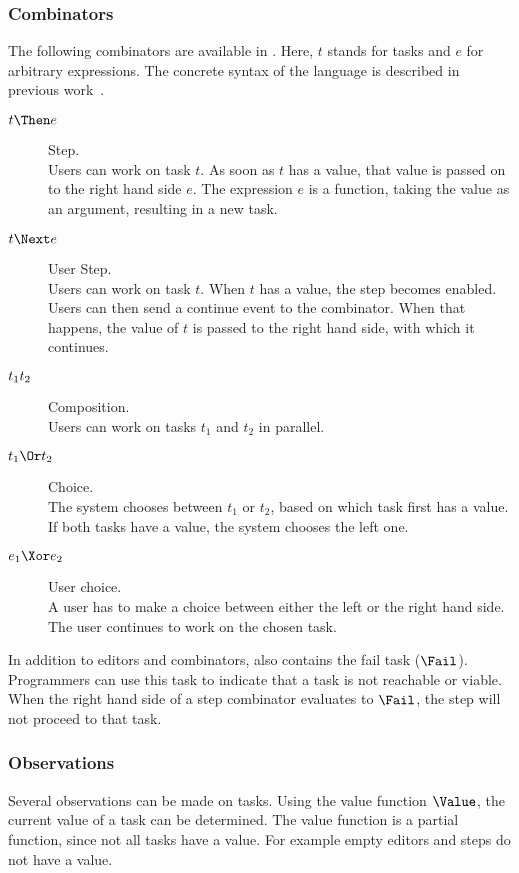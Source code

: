 \subsubsection{Combinators}

The following combinators are available in \TOPHAT.
Here, $t$ stands for tasks and $e$ for arbitrary expressions.
The concrete syntax of the language is described in previous work~\cite{Steenvoorden2019}.
\begin{description}
  \item[$t \Then e$] Step.\\
    Users can work on task $t$.
    As soon as $t$ has a value, that value is passed on to the right hand side $e$.
    The expression $e$ is a function, taking the value as an argument, resulting in a new task.
  \item[$t \Next e$] User Step.\\
    Users can work on task $t$.
    When $t$ has a value, the step becomes enabled.
    Users can then send a continue event to the combinator.
    When that happens, the value of $t$ is passed to the right hand side, with which it continues.
  \item[$t_1 \relax t_2$] Composition.\\
    Users can work on tasks $t_1$ and $t_2$ in parallel.
  \item[$t_1 \Or t_2$] Choice.\\
    The system chooses between $t_1$ or $t_2$,
    based on which task first has a value.
    If both tasks have a value, the system chooses the left one.
  \item[$e_1 \Xor e_2$] User choice.\\
    A user has to make a choice between either the left or the right hand side.
    The user continues to work on the chosen task.
\end{description}

In addition to editors and combinators, \TOPHAT also contains the fail task ($\Fail$).
Programmers can use this task to indicate that a task is not reachable or viable.
When the right hand side of a step combinator evaluates to $\Fail$, the step will not proceed to that task.



\subsubsection{Observations}

Several observations can be made on tasks.
Using the value function $\Value$, the current value of a task can be determined.
The value function is a partial function, since not all tasks have a value.
For example empty editors and steps do not have a value.

